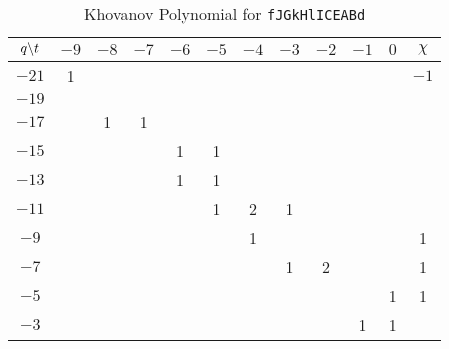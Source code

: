 \documentclass{article}
\theoremstyle{plain}
\begin{document}
        \begin{table}[H]
            \centering
            \begin{tabular}{| c | c | c | c | c | c | c | c | c | c | c | c |}
                \hline
                $q\symbol{92}t$&$-9$&$-8$&$-7$&$-6$&$-5$&$-4$&$-3$&$-2$&$-1$&$0$&$\chi$\\
                \hline
                $-21$&1&&&&&&&&&&$-1$\\
                \hline
                $-19$&&&&&&&&&&&\\
                \hline
                $-17$&&1&1&&&&&&&&\\
                \hline
                $-15$&&&&1&1&&&&&&\\
                \hline
                $-13$&&&&1&1&&&&&&\\
                \hline
                $-11$&&&&&1&2&1&&&&\\
                \hline
                $-9$&&&&&&1&&&&&1\\
                \hline
                $-7$&&&&&&&1&2&&&1\\
                \hline
                $-5$&&&&&&&&&&1&1\\
                \hline
                $-3$&&&&&&&&&1&1&\\
                \hline
            \end{tabular}
            \caption{Khovanov Polynomial for \texttt{fJGkHlICEABd}}
            \label{table:fJGkHlICEABd_kho}
        \end{table}
\end{document}
